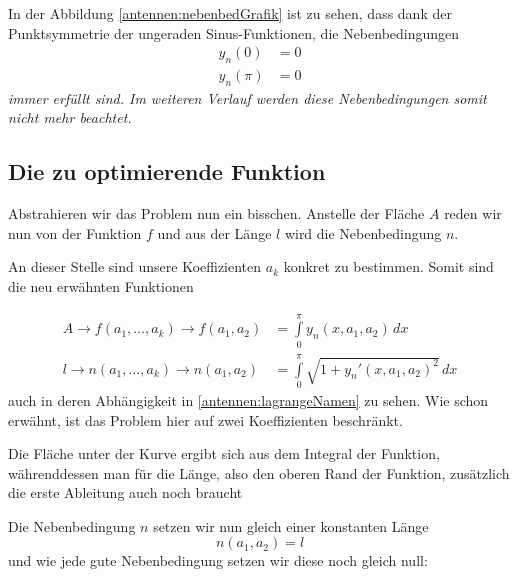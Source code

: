 In der Abbildung \ref{antennen:nebenbedGrafik} ist zu sehen, dass dank der Punktsymmetrie 
der ungeraden Sinus-Funktionen, die Nebenbedingungen
\begin{equation}
	\begin{aligned}
		y_n(0)
		&=
		0
		\\
		y_n(\pi)
		&=
		0
	\end{aligned}
\label{antennen:nebenbed3eck}
\end{equation}
\em immer erfüllt \em sind. Im weiteren Verlauf werden diese 
Nebenbedingungen somit nicht mehr beachtet.

\subsection{Die zu optimierende Funktion \label{antennen:optmFunktion}}


Abstrahieren wir das Problem nun ein bisschen. Anstelle der Fläche $A$ reden wir nun von 
der Funktion $f$ und aus der Länge $l$ wird die Nebenbedingung $n$. 

An dieser Stelle sind unsere Koeffizienten $a_k$ konkret zu bestimmen. 
Somit sind die neu erwähnten Funktionen 

\begin{equation}
\begin{aligned}
	A
	\rightarrow
	f(a_1,\ldots,a_k)
	\rightarrow
	f(a_1,a_2)
	&=
	\int\limits_{0}^{\pi} y_n(x,a_1,a_2)\, dx
	\\
	l
	\rightarrow
	n(a_1,\ldots,a_k)
	\rightarrow
	n(a_1,a_2)
	&=
	\int\limits_{0}^{\pi} \sqrt{1+y_n'(x, a_1, a_2)^2}\, dx
\end{aligned}
\label{antennen:lagrangeNamen}
\end{equation}
auch in deren Abhängigkeit in \eqref{antennen:lagrangeNamen} zu sehen. Wie schon erwähnt, 
ist das Problem hier auf zwei Koeffizienten beschränkt. 

Die Fläche unter der Kurve ergibt sich aus dem Integral der Funktion, 
währenddessen man für die Länge, also den oberen Rand der Funktion, 
zusätzlich die erste Ableitung auch noch braucht

Die Nebenbedingung $n$ setzen wir nun gleich einer konstanten Länge
\begin{equation}
n(a_1, a_2)
=
l
\label{antennen:constNebenbed}
\end{equation}
und wie jede gute Nebenbedingung setzen wir diese noch gleich null:

